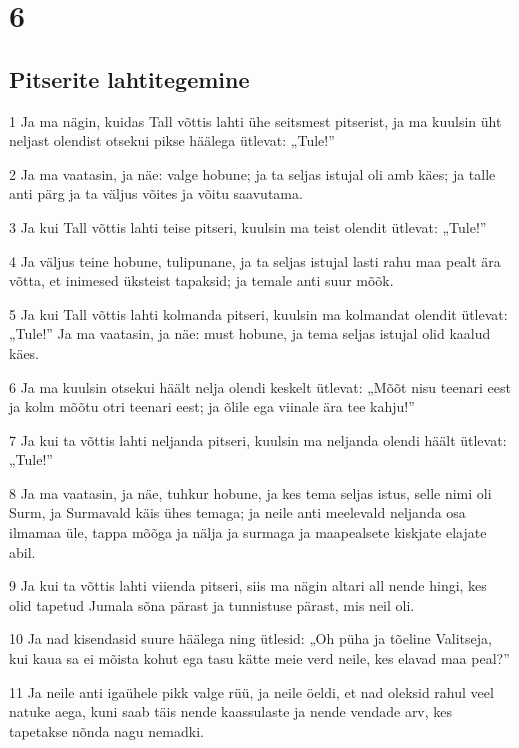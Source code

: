 \chapter{6}

\section*{Pitserite lahtitegemine}

\par 1 Ja ma nägin, kuidas Tall võttis lahti ühe seitsmest pitserist, ja ma kuulsin üht neljast olendist otsekui pikse häälega ütlevat: „Tule!”
\par 2 Ja ma vaatasin, ja näe: valge hobune; ja ta seljas istujal oli amb käes; ja talle anti pärg ja ta väljus võites ja võitu saavutama.
\par 3 Ja kui Tall võttis lahti teise pitseri, kuulsin ma teist olendit ütlevat: „Tule!”
\par 4 Ja väljus teine hobune, tulipunane, ja ta seljas istujal lasti rahu maa pealt ära võtta, et inimesed üksteist tapaksid; ja temale anti suur mõõk.
\par 5 Ja kui Tall võttis lahti kolmanda pitseri, kuulsin ma kolmandat olendit ütlevat: „Tule!” Ja ma vaatasin, ja näe: must hobune, ja tema seljas istujal olid kaalud käes.
\par 6 Ja ma kuulsin otsekui häält nelja olendi keskelt ütlevat: „Mõõt nisu teenari eest ja kolm mõõtu otri teenari eest; ja õlile ega viinale ära tee kahju!”
\par 7 Ja kui ta võttis lahti neljanda pitseri, kuulsin ma neljanda olendi häält ütlevat: „Tule!”
\par 8 Ja ma vaatasin, ja näe, tuhkur hobune, ja kes tema seljas istus, selle nimi oli Surm, ja Surmavald käis ühes temaga; ja neile anti meelevald neljanda osa ilmamaa üle, tappa mõõga ja nälja ja surmaga ja maapealsete kiskjate elajate abil.
\par 9 Ja kui ta võttis lahti viienda pitseri, siis ma nägin altari all nende hingi, kes olid tapetud Jumala sõna pärast ja tunnistuse pärast, mis neil oli.
\par 10 Ja nad kisendasid suure häälega ning ütlesid: „Oh püha ja tõeline Valitseja, kui kaua sa ei mõista kohut ega tasu kätte meie verd neile, kes elavad maa peal?”
\par 11 Ja neile anti igaühele pikk valge rüü, ja neile öeldi, et nad oleksid rahul veel natuke aega, kuni saab täis nende kaassulaste ja nende vendade arv, kes tapetakse nõnda nagu nemadki.
